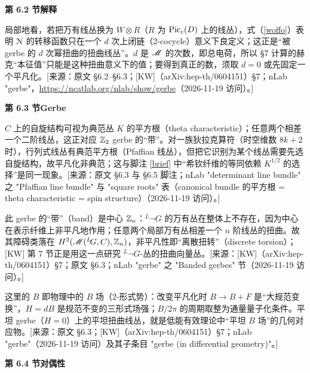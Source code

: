 \medskip\noindent\textbf{第 6.2 节\quad 解释}\par\nopagebreak
\begin{description}[leftmargin=5.8em,labelwidth=5em,labelsep=0.6em,itemsep=0.15ex,topsep=0.2ex]
\item[6.2-1] 局部地看，若把万有线丛换为 $W\otimes R$（$R$ 为 ${\mathrm{Pic}}_c(D)$ 上的线丛），式（\ref{woffo}）表明 ${\cal N}$ 的转移函数只在一个 $d$ 次上闭链（2-cocycle）意义下良定义；这正是“被 gerbe 的 $d$ 次幂扭曲的扭曲线丛”。$d$ 是 ${\mathscr{M}}$ 的次数，即总电荷，所以 §7 计算的赫克“本征值”只能是这种扭曲意义下的值；要得到真正的数，须取 $d=0$ 或先固定一个平凡化。[来源：原文 §6.2–§6.3；[KW]（arXiv:hep-th/0604151）§7；nLab "gerbe"，\url{https://ncatlab.org/nlab/show/gerbe}（2026-11-19 访问）。]
\end{description}
\medskip\noindent\textbf{第 6.3 节\quad Gerbe}\par\nopagebreak
\begin{description}[leftmargin=5.8em,labelwidth=5em,labelsep=0.6em,itemsep=0.15ex,topsep=0.2ex]
\item[6.3-1] $C$ 上的自旋结构可视为典范丛 $K$ 的平方根（theta characteristic）；任意两个相差一个二阶线丛，这正对应 ${\mathbb Z}_2$ gerbe 的“带”。对一族狄拉克算符（时空维数 $8k+2$ 时），行列式线丛有典范平方根（Pfaffian 线丛），但把它识别为某个线丛需要先选自旋结构，故平凡化非典范；这与脚注 \ref{brief} 中“希钦纤维的等同依赖 $K^{1/2}$ 的选择”是同一现象。[来源：原文 §6.3 与 §6.5 脚注；nLab "determinant line bundle" 之 "Pfaffian line bundle" 与 "square roots" 表（canonical bundle 的平方根 = theta characteristic = spin structure）（2026-11-19 访问）。]
\item[6.3-2] 此 gerbe 的“带”（band）是中心 ${\mathbb Z}_n$：$^L\neg G$ 的万有丛在整体上不存在，因为中心在表示纤维上非平凡地作用；任意两个局部万有丛相差一个 $n$ 阶线丛的扭曲。故其障碍类落在 $H^2({\mathscr{M}}(^L\negthinspace G,C),{\mathbb Z}_n)$，非平凡性即“离散扭转”（discrete torsion）；[KW] 第 7 节正是用这一点研究 $^L\neg G$-丛的扭曲向量丛。[来源：[KW]（arXiv:hep-th/0604151）§7；原文 §6.3；nLab "gerbe" 之 "Banded gerbes" 节（2026-11-19 访问）。]
\item[6.3-3] 这里的 $B$ 即物理中的 $B$ 场（2-形式势）：改变平凡化时 $B\to B+F$ 是“大规范变换”，$H=dB$ 是规范不变的三形式场强；$B/2\pi$ 的周期取整为通量量子化条件。平坦 gerbe（$H=0$）上的平坦扭曲线丛，就是低能有效理论中“平坦 $B$ 场”的几何对应物。[来源：原文 §6.3；[KW]（arXiv:hep-th/0604151）§7；nLab "gerbe"（2026-11-19 访问）及其子条目 "gerbe (in differential geometry)"。]
\end{description}
\medskip\noindent\textbf{第 6.4 节\quad 对偶性}\par\nopagebreak
